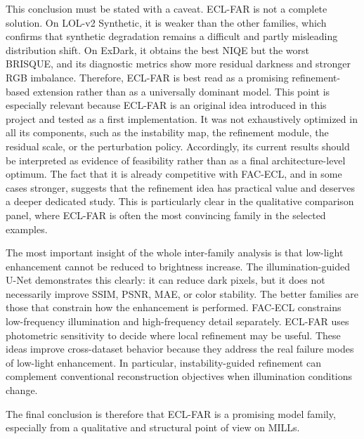 This conclusion must be stated with a caveat. ECL-FAR is not a complete solution. On LOL-v2 Synthetic, it is weaker than the other families, which confirms that synthetic degradation remains a difficult and partly misleading distribution shift. On ExDark, it obtains the best NIQE but the worst BRISQUE, and its diagnostic metrics show more residual darkness and stronger RGB imbalance. Therefore, ECL-FAR is best read as a promising refinement-based extension rather than as a universally dominant model. This point is especially relevant because ECL-FAR is an original idea introduced in this project and tested as a first implementation. It was not exhaustively optimized in all its components, such as the instability map, the refinement module, the residual scale, or the perturbation policy. Accordingly, its current results should be interpreted as evidence of feasibility rather than as a final architecture-level optimum. The fact that it is already competitive with FAC-ECL, and in some cases stronger, suggests that the refinement idea has practical value and deserves a deeper dedicated study. This is particularly clear in the qualitative comparison panel, where ECL-FAR is often the most convincing family in the selected examples.

The most important insight of the whole inter-family analysis is that low-light enhancement cannot be reduced to brightness increase. The illumination-guided U-Net demonstrates this clearly: it can reduce dark pixels, but it does not necessarily improve SSIM, PSNR, MAE, or color stability. The better families are those that constrain how the enhancement is performed. FAC-ECL constrains low-frequency illumination and high-frequency detail separately. ECL-FAR uses photometric sensitivity to decide where local refinement may be useful. These ideas improve cross-dataset behavior because they address the real failure modes of low-light enhancement. In particular, instability-guided refinement can complement conventional reconstruction objectives when illumination conditions change.

The final conclusion is therefore that ECL-FAR is a promising model family, especially from a qualitative and structural point of view on MILLs.